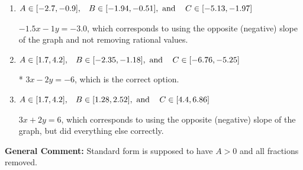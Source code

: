 \documentclass{extbook}[14pt]
\begin{document}
\begin{enumerate}
{\begin{enumerate}[label=\Alph*.]
 $-1.5x + 1y = 3.0$, which corresponds to not removing rational values for Standard Form.
\item \( A \in [-2.7, -0.9], \hspace{3mm} B \in [-1.94, -0.51], \text{ and } \hspace{3mm} C \in [-5.13, -1.97] \)

 $-1.5x - 1y = -3.0$, which corresponds to using the opposite (negative) slope of the graph and not removing rational values.
\item \( A \in [1.7, 4.2], \hspace{3mm} B \in [-2.35, -1.18], \text{ and } \hspace{3mm} C \in [-6.76, -5.25] \)

* $3x - 2y = -6$, which is the correct option.
\item \( A \in [1.7, 4.2], \hspace{3mm} B \in [1.28, 2.52], \text{ and } \hspace{3mm} C \in [4.4, 6.86] \)

 $3x + 2y = 6$, which corresponds to using the opposite (negative) slope of the graph, but did everything else correctly.
\end{enumerate}

\textbf{General Comment:} Standard form is supposed to have $A > 0$ and all fractions removed.
}
\end{enumerate}
\end{document}
